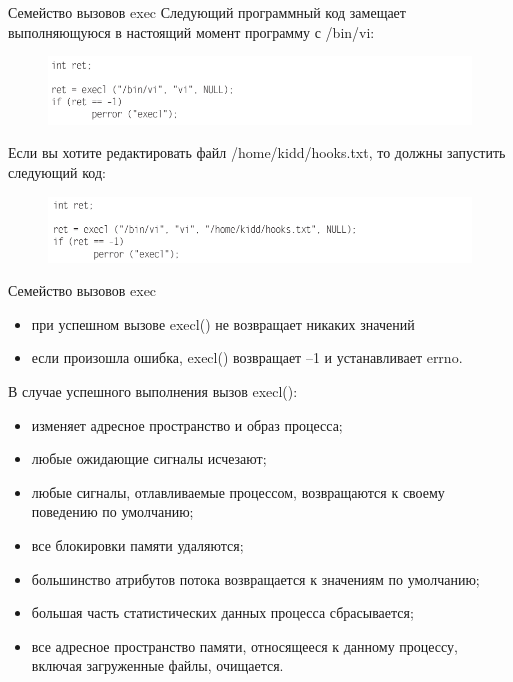 \documentclass{beamer}
\begin{document}
\begin{frame}{Семейство вызовов exec}
Следующий программный код замещает выполняющуюся в настоящий момент программу с /bin/vi:
\begin{figure}[h]
\centering
\includegraphics[scale=0.5]{images/lec07-pic05.png}
\end{figure}
Если вы хотите редактировать файл /home/kidd/hooks.txt, то должны запустить следующий код:
\begin{figure}[h]
\centering
\includegraphics[scale=0.5]{images/lec07-pic06.png}
\end{figure}
\end{frame}

\begin{frame}{Семейство вызовов exec}
\begin{itemize}
\item при успешном вызове execl() не возвращает никаких значений 
\item если произошла ошибка, execl() возвращает –1 и устанавливает errno.
\end{itemize}
В случае успешного выполнения вызов execl():
\begin{itemize}
\item изменяет адресное пространство и образ процесса;
\item любые ожидающие сигналы исчезают;
\item любые сигналы, отлавливаемые процессом, возвращаются к своему
поведению по умолчанию;
\item все блокировки памяти удаляются;
\item большинство атрибутов потока возвращается к значениям по умолчанию;
\item большая часть статистических данных процесса сбрасывается;
\item все адресное пространство памяти, относящееся к данному процессу, включая
загруженные файлы, очищается.
\end{itemize}
\end{frame}
\end{document}
